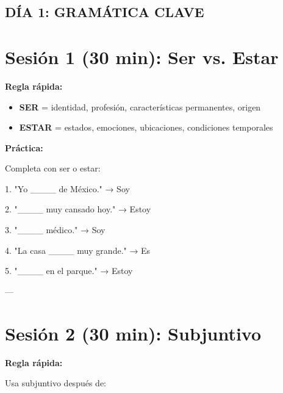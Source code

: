 \documentclass[a4paper,11pt]{article}
\begin{document}
\vspace{0.2cm}

\subsection{DÍA 1: GRAMÁTICA CLAVE}

\vspace{0.2cm}

\section{Sesión 1 (30 min): Ser vs. Estar}

\vspace{0.2cm}

\textbf{Regla rápida:}

\begin{itemize}

  \item \textbf{SER} = identidad, profesión, características permanentes, origen

  \item \textbf{ESTAR} = estados, emociones, ubicaciones, condiciones temporales

\end{itemize}

\vspace{0.2cm}

\textbf{Práctica:}

Completa con ser o estar:

1. "Yo ____ de México." → Soy

2. "____ muy cansado hoy." → Estoy

3. "____ médico." → Soy

4. "La casa ____ muy grande." → Es

5. "____ en el parque." → Estoy

\vspace{0.2cm}

---

\vspace{0.2cm}

\section{Sesión 2 (30 min): Subjuntivo}

\vspace{0.2cm}

\textbf{Regla rápida:}

Usa subjuntivo después de:
\end{document}
